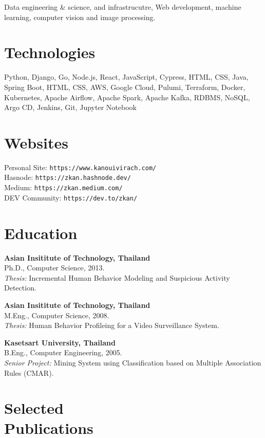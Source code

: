 \documentclass[margin, 10pt]{res}
\begin{document}
\begin{resume}
Data engineering \& science, and infrastrucutre, Web development,
machine learning, computer vision and image processing.

\section{Technologies}

Python, Django, Go, Node.js, React, JavaScript, Cypress, HTML, CSS,
Java, Spring Boot, HTML, CSS, AWS, Google Cloud, Pulumi, Terraform,
Docker, Kubernetes, Apache Airflow, Apache Spark, Apache Kafka, RDBMS, NoSQL,
Argo CD, Jenkins, Git, Jupyter Notebook

\section{Websites}

Personal Site: {\tt https://www.kanouivirach.com/}\\
Hasnode: {\tt https://zkan.hashnode.dev/}\\
Medium: {\tt https://zkan.medium.com/}\\
DEV Community: {\tt https://dev.to/zkan/}\\

\section{Education}

{\bf Asian Insititute of Technology, Thailand} \\
Ph.D., Computer Science, 2013. \\
{\it Thesis:} Incremental Human Behavior Modeling and Suspicious Activity
Detection.

{\bf Asian Insititute of Technology, Thailand} \\
M.Eng., Computer Science, 2008. \\
{\it Thesis:} Human Behavior Profileing for a Video Surveillance System.

{\bf Kasetsart University, Thailand} \\
B.Eng., Computer Engineering, 2005. \\
{\it Senior Project:} Mining System using Classification based on Multiple
Association Rules (CMAR).

\section{Selected \\ Publications}


\end{resume}
\end{document}
